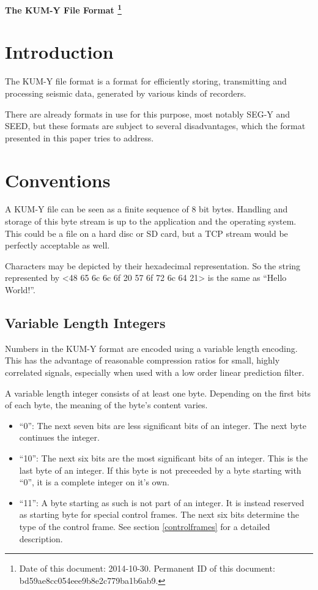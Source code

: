 \documentclass[DIV=10]{scrartcl}
\begin{document}
\strut

\vspace{1cm}

\centerline{\huge \textbf{The KUM-Y File Format%
\footnote{\raggedright Date of this document: 2014-10-30.
Permanent ID of this document: bd59ae8cc054eee9b8e2c779ba1b6ab9.}}}

\vspace{1cm}

\section{Introduction}

The KUM-Y file format is a format for efficiently storing, transmitting and processing seismic data, generated by various kinds of recorders.

There are already formats in use for this purpose, most notably SEG-Y and SEED, but these formats are subject to several disadvantages, which the format presented in this paper tries to address.

\section{Conventions}

A KUM-Y file can be seen as a finite sequence of 8 bit bytes.
Handling and storage of this byte stream is up to the application and the operating system.
This could be a file on a hard disc or SD card, but a TCP stream would be perfectly acceptable as well.

Characters may be depicted by their hexadecimal representation.
So the string represented by <48 65 6c 6c 6f 20 57 6f 72 6c 64 21> is the same as “Hello World!”.

\subsection{Variable Length Integers}
\label{varint}

Numbers in the KUM-Y format are encoded using a variable length encoding.
This has the advantage of reasonable compression ratios for small, highly correlated signals, especially when used with a low order linear prediction filter.

A variable length integer consists of at least one byte.
Depending on the first bits of each byte, the meaning of the byte’s content varies.

\begin{itemize}
\item “0”: The next seven bits are less significant bits of an integer.
The next byte continues the integer.
\item “10”: The next six bits are the most significant bits of an integer.
This is the last byte of an integer.
If this byte is not preceeded by a byte starting with “0”, it is a complete integer on it’s own.
\item “11”: A byte starting as such is not part of an integer.
It is instead reserved as starting byte for special control frames.
The next six bits determine the type of the control frame.
See section \ref{controlframes} for a detailed description.
\end{itemize}
\end{document}
